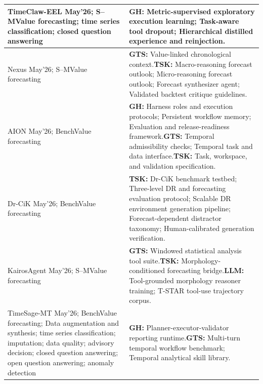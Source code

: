 \documentclass[preprints,article,submit,moreauthors]{Definitions/mdpi}
\newcommand{\typeSMshort}{\textsf{S--M}}
\newcommand{\typeBenchshort}{\textsf{Bench}}
\begin{document}
\begin{longtable}{@{}>{\raggedright\arraybackslash}p{}p{}@{}}
TimeClaw-EEL \citep{timeclaw2026explore} May'26; \typeSMshort{}\newline Value forecasting; time series classification; closed question answering & \textbf{GH:} Metric-supervised exploratory execution learning; Task-aware tool dropout; Hierarchical distilled experience and reinjection.\\\midrule
Nexus \citep{nexus2026} May'26; \typeSMshort{}\newline Value forecasting & \textbf{GTS:} Value-linked chronological context.\newline\textbf{TSK:} Macro-reasoning forecast outlook; Micro-reasoning forecast outlook; Forecast synthesizer agent; Validated backtest critique guidelines.\\\midrule
AION \citep{aion2026} May'26; \typeBenchshort{}\newline Value forecasting & \textbf{GH:} Harness roles and execution protocols; Persistent workflow memory; Evaluation and release-readiness framework.\newline\textbf{GTS:} Temporal admissibility checks; Temporal task and data interface.\newline\textbf{TSK:} Task, workspace, and validation specification.\\\midrule
Dr-CiK \citep{drcik2026} May'26; \typeBenchshort{}\newline Value forecasting & \textbf{TSK:} Dr-CiK benchmark testbed; Three-level DR and forecasting evaluation protocol; Scalable DR environment generation pipeline; Forecast-dependent distractor taxonomy; Human-calibrated generation verification.\\\midrule
KairosAgent \citep{kairosagent2026} May'26; \typeSMshort{}\newline Value forecasting & \textbf{GTS:} Windowed statistical analysis tool suite.\newline\textbf{TSK:} Morphology-conditioned forecasting bridge.\newline\textbf{LLM:} Tool-grounded morphology reasoner training; T-STAR tool-use trajectory corpus.\\\midrule
TimeSage-MT \citep{timesagemt2026} May'26; \typeBenchshort{}\newline Value forecasting; Data augmentation and synthesis; time series classification; imputation; data quality; advisory decision; closed question answering; open question answering; anomaly detection & \textbf{GH:} Planner-executor-validator reporting runtime.\newline\textbf{GTS:} Multi-turn temporal workflow benchmark; Temporal analytical skill library.\\\midrule

\end{longtable}
\end{document}
